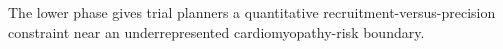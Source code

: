 The lower phase gives trial planners a quantitative recruitment-versus-precision constraint near an underrepresented cardiomyopathy-risk boundary.